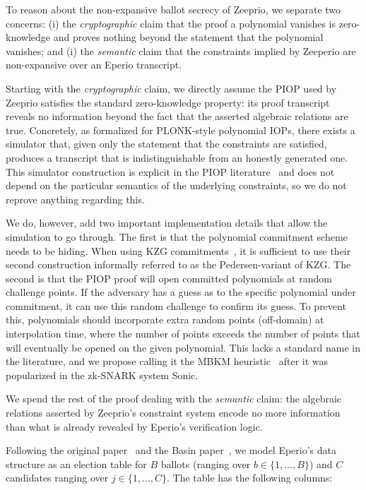 To reason about the non-expansive ballot secrecy of Zeeprio, we separate two concerns: (i) the \emph{cryptographic} claim that the proof a polynomial vanishes is zero-knowledge and proves nothing beyond the statement that the polynomial vanishes; and (i) the \emph{semantic} claim that the constraints implied by Zeeperio are non-expansive over an Eperio transcript.

Starting with the \emph{cryptographic} claim, we directly assume the PIOP used by Zeeprio satisfies the standard zero-knowledge property: its proof transcript reveals no information beyond the fact that the asserted algebraic relations are true. Concretely, as formalized for PLONK-style polynomial IOPs, there exists a simulator that, given only the statement that the constraints are satisfied, produces a transcript that is indistinguishable from an honestly generated one. This simulator construction is explicit in the PIOP literature~\cite{Sef24,Lip25} and does not depend on the particular semantics of the underlying constraints, so we do not reprove anything regarding this.

We do, however, add two important implementation details that allow the simulation to go through. The first is that the polynomial commitment scheme needs to be hiding. When using KZG commitments~\cite{KZG10}, it is sufficient to use their second construction informally referred to as the Pedersen-variant of KZG. The second is that the PIOP proof will open committed polynomials at random challenge points. If the adversary has a guess as to the specific polynomial under commitment, it can use this random challenge to confirm its guess. To prevent this, polynomials should incorporate extra random points (off-domain) at interpolation time, where the number of points exceeds the number of points that will eventually be opened on the given polynomial. This lacks a standard name in the literature, and we propose calling it the MBKM heuristic~\cite{MBKM19} after it was popularized in the zk-SNARK system Sonic.

We spend the rest of the proof dealing with the \emph{semantic} claim: the algebraic relations asserted by Zeeprio’s constraint system encode no more information than what is already revealed by Eperio’s verification logic.

Following the original paper~\cite{ECHA10} and the Basin \etal paper~\cite{BDGR21}, we model Eperio's data structure as an election table for $B$ ballots (ranging over  $b \in \{1,\dots,B\}$) and $C$ candidates ranging over $j \in \{1,\dots,C\}$. The table has the following columns:

